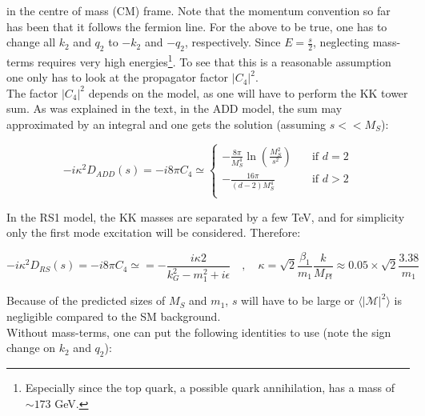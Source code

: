 \documentclass[11pt,a4paper]{article}
\begin{document}
in the centre of mass (CM) frame. Note that the momentum convention so far has been that it follows the fermion line. For the above to be true, one has to change all $k_2$ and $q_2$ to $-k_2$ and $-q_2$, respectively. Since $E = \frac{s}{2}$, neglecting mass-terms requires very high energies\footnote{Especially since the top quark, a possible quark annihilation, has a mass of $\sim 173$ GeV.}. To see that this is a reasonable assumption one only has to look at the propagator factor $|C_4|^2$.\\
The factor $|C_4|^2$ depends on the model, as one will have to perform the KK tower sum. As was explained in the text, in the ADD model, the sum may approximated by an integral and one gets the solution (assuming $s<<M_S$):

\begin{equation}
	-i\kappa^2D_{ADD}(s) = -i8\pi C_4\simeq
	\begin{cases}
	-\frac{8\pi}{M_S^4}\ln\left(\frac{M_S^2}{s^2}\right)       & \quad \text{if } d=2\\
	-\frac{16\pi}{(d-2)M_S^4}  & \quad \text{if } d>2\\
	\end{cases}
\end{equation}

In the RS1 model, the KK masses are separated by a few TeV, and for simplicity only the first mode excitation will be considered. Therefore:

\begin{equation}
	-i\kappa^2D_{RS}(s) = -i8\pi C_4\simeq = -\frac{i\kappa 2}{k_G^2 - m_1^2 + i\epsilon}\quad,\quad \kappa = \sqrt{2}\frac{\beta_1}{m_1}\frac{k}{M_{Pl}} \approx 0.05\times\sqrt{2}\frac{3.38}{m_1}
\end{equation}

Because of the predicted sizes of $M_S$ and $m_1$, $s$ will have to be large or $\langle|\mathcal{M}|^2\rangle$ is negligible compared to the SM background.\\
Without mass-terms, one can put the following identities to use (note the sign change on $k_2$ and $q_2$):
\end{document}
